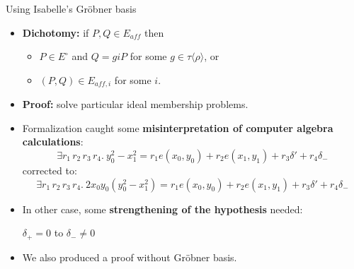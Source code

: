 \documentclass[10pt]{beamer}
\begin{document}
\begin{frame}{Using Isabelle's Gr\"obner basis}
\begin{itemize}
	\item \textbf{Dichotomy:} if $P,Q \in E_{aff}$ then 
	
	\begin{itemize}
		\item $P \in E^{\circ}$ and $Q = g i P$ for some $g \in \tau \langle \rho \rangle$, or
		\item $(P, Q) \in E_{aff,i}$ for some $i$.
	\end{itemize}
	
	\item \textbf{Proof:} solve particular ideal membership problems.
	\item Formalization caught some \textbf{misinterpretation of computer algebra calculations}:	
	\[
	\exists r_1 \, r_2 \, r_3 \, r_4.\ 
	y_0^2 - x_1^2 = r_1 e(x_0,y_0) + r_2 e(x_1,y_1) + r_3 \delta' + r_4
	\delta_{-} 
	\] 
	corrected to:
	\[
	\exists r_1 \, r_2 \, r_3 \, r_4.\ 
	2 x_0 y_0 (y_0^2 - x_1^2) = r_1 e(x_0,y_0) + r_2 e(x_1,y_1) + r_3 \delta' + r_4
	\delta_{-}
	\]
	\item In other case, some \textbf{strengthening of the hypothesis} needed:
	
	$\delta_{+} = 0$ to $\delta_{-} \neq 0$
	
	\item We also produced a proof without Gr\"obner basis. 
\end{itemize}
\end{frame}
\end{document}
